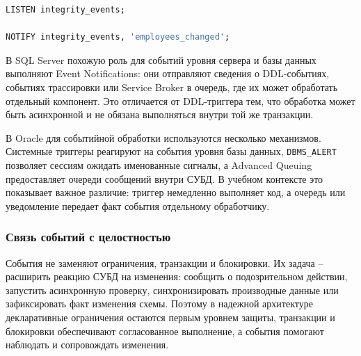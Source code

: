\begin{lstlisting}[language=SQL]
LISTEN integrity_events;

NOTIFY integrity_events, 'employees_changed';
\end{lstlisting}

В SQL Server похожую роль для событий уровня сервера и базы данных выполняют Event Notifications: они отправляют сведения о DDL-событиях, событиях трассировки или Service Broker в очередь, где их может обработать отдельный компонент. Это отличается от DDL-триггера тем, что обработка может быть асинхронной и не обязана выполняться внутри той же транзакции.

В Oracle для событийной обработки используются несколько механизмов. Системные триггеры реагируют на события уровня базы данных, \texttt{DBMS\_ALERT} позволяет сессиям ожидать именованные сигналы, а Advanced Queuing предоставляет очереди сообщений внутри СУБД. В учебном контексте это показывает важное различие: триггер немедленно выполняет код, а очередь или уведомление передает факт события отдельному обработчику.

\subsubsection{Связь событий с целостностью}

События не заменяют ограничения, транзакции и блокировки. Их задача -- расширить реакцию СУБД на изменения: сообщить о подозрительном действии, запустить асинхронную проверку, синхронизировать производные данные или зафиксировать факт изменения схемы. Поэтому в надежной архитектуре декларативные ограничения остаются первым уровнем защиты, транзакции и блокировки обеспечивают согласованное выполнение, а события помогают наблюдать и сопровождать изменения.
